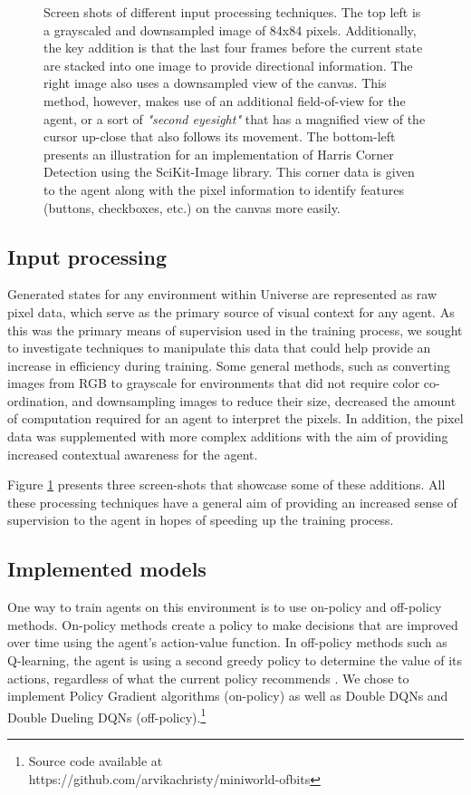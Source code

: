 \documentclass[10pt,journal,compsoc]{IEEEtran}
\begin{document}
\begin{figure}[t!]
	\caption{Screen shots of different input processing techniques. The top left is a grayscaled and downsampled image of 84x84 pixels. Additionally, the key addition is that the last four frames before the current state are stacked into one image to provide directional information. The right image also uses a downsampled view of the canvas. This method, however, makes use of an additional field-of-view for the agent, or a sort of \textit{"second eyesight"} that has a magnified view of the cursor up-close that also follows its movement. The bottom-left presents an illustration for an implementation of Harris Corner Detection using the SciKit-Image library. This corner data is given to the agent along with the pixel information to identify features (buttons, checkboxes, etc.) on the canvas more easily.}
	\label{fig:inputprocessing}
\end{figure}

\subsection{Input processing}
Generated states for any environment within Universe are represented as raw pixel data, which serve as the primary source of visual context for any agent. As this was the primary means of supervision used in the training process, we sought to investigate techniques to manipulate this data that could help provide an increase in efficiency during training. Some general methods, such as converting images from RGB to grayscale for environments that did not require color co-ordination, and downsampling images to reduce their size, decreased the amount of computation required for an agent to interpret the pixels. In addition, the pixel data was supplemented with more complex additions with the aim of providing increased contextual awareness for the agent.

Figure \ref{fig:inputprocessing} presents three screen-shots that showcase some of these additions.  All these processing techniques have a general aim of providing an increased sense of supervision to the agent in hopes of speeding up the training process.

\subsection{Implemented models}
One way to train agents on this environment is to use on-policy and off-policy methods. On-policy methods create a policy to make decisions that are improved over time using the agent's action-value function. In off-policy methods such as Q-learning, the agent is using a second greedy policy to determine the value of its actions, regardless of what the current policy recommends \cite{sutton1998reinforcement}. We chose to implement Policy Gradient algorithms (on-policy) as well as Double DQNs and Double Dueling DQNs (off-policy).\footnote[2]{Source code available at \\\indent \indent https://github.com/arvikachristy/miniworld-ofbits}
\end{document}
